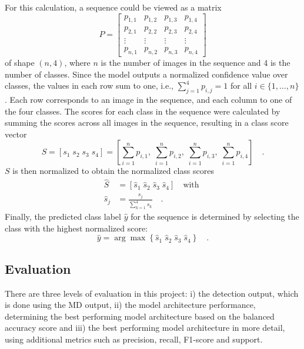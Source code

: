     For this calculation, a sequence could be viewed as a matrix
    \begin{equation}
        P = 
        \begin{bmatrix}
        p_{1,1} & p_{1,2} & p_{1,3} & p_{1,4} \\
        p_{2,1} & p_{2,2} & p_{2,3} & p_{2,4} \\
        \vdots  & \vdots  & \vdots  & \vdots  \\
        p_{n,1} & p_{n,2} & p_{n,3} & p_{n,4}
        \end{bmatrix}
    \label{eq:sequence_matrix}
    \end{equation}
    of shape \((n, 4)\), where \(n\) is the number of images in the sequence and 4 is the number of classes.
    Since the model outputs a normalized confidence value over classes, the values in each row sum to one, i.e., \( \sum_{j=1}^{4} p_{i,j} = 1 \) for all \( i \in \{1, \ldots, n\} \).
    Each row corresponds to an image in the sequence, and each column to one of the four classes.
    The scores for each class in the sequence were calculated by summing the scores across all images in the sequence, resulting in a class score vector
    \begin{equation}
        S = [s_1\; s_2\; s_3\; s_4] = \left[ \sum_{i=1}^n p_{i,1},\; \sum_{i=1}^n p_{i,2},\; \sum_{i=1}^n p_{i,3},\; \sum_{i=1}^n p_{i,4} \right]\quad.
    \label{eq:class_score_vector}
    \end{equation}
    \( S \) is then normalized to obtain the normalized class scores 
    \begin{align}
        \hat{S} &= [\hat{s}_1\; \hat{s}_2\; \hat{s}_3\; \hat{s}_4]\quad \text{with }\\
     \hat{s}_j &= \frac{s_j}{\sum_{k=1}^4  s_k}\quad.
    \label{eq:normalized_class_scores}
    \end{align}
    Finally, the predicted class label \( \hat{y} \) for the sequence is determined by selecting the class with the highest normalized score:
    \begin{equation}
        \hat{y} = \arg\max \left\{\hat{s}_1\; \hat{s}_2\; \hat{s}_3\; \hat{s}_4\right\}\quad.
    \label{eq:predicted_sequence_label}
    \end{equation}

    \subsection{Evaluation}
    There are three levels of evaluation in this project:
    i) the detection output, which is done using the \ac{MD} output,
    ii) the model architecture performance, determining the best performing model architecture based on the balanced accuracy score and
    iii) the best performing model architecture in more detail, using additional metrics such as precision, recall, F1-score and support.

